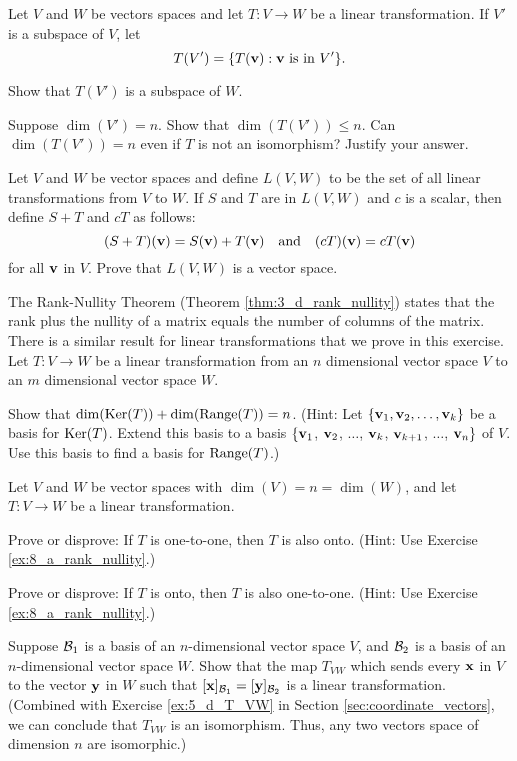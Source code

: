\item Let $V$ and $W$ be vectors spaces and let $T: V \to W$ be a linear transformation. If $V'$ is a subspace of $V$, let 
\[T(V') = \{T(\mathbf{v}) : \mathbf{v} \text{ is in } V'\}.\]
	\ba
	\item Show that $T(V')$ is a subspace of $W$. 
	\item Suppose $\dim(V') = n$. Show that $\dim(T(V')) \leq n$. Can  $\dim(T(V')) = n$ even if $T$ is not an isomorphism? Justify your answer. 
	\ea



\item \label{ex:8_a_transformation_space} Let $V$ and $W$ be vector spaces and define $L(V,W)$ to be the set of all linear transformations from $V$ to $W$. If $S$ and $T$ are in $L(V,W)$ and $c$ is a scalar,  then define $S+T$ and $cT$ as follows:
\[(S+T)(\vv) = S(\vv) + T(\vv) \ \ \text{ and } \ \ (cT)(\vv) = cT(\vv)\]
for all $\mathbf{v}$ in $V$. Prove that $L(V,W)$ is a vector space. 
 
\item \label{ex:8_a_rank_nullity} The Rank-Nullity Theorem (Theorem \ref{thm:3_d_rank_nullity}) states that the rank plus the nullity of a matrix equals the number of columns of the matrix. There is a similar result for linear transformations that we prove in this exercise. Let $T : V \to W$ be a linear transformation from an $n$ dimensional vector space $V$ to an $m$ dimensional vector space $W$. 

Show that $\dim(\text{Ker}(T)) + \dim(\text{Range}(T)) = n$. (Hint: Let $\{\mathbf{v}_1, \mathbf{v}_2, \ldots, \mathbf{v}_k\}$ be a basis for $\text{Ker}(T)$. Extend this basis to a basis $\{\mathbf{v}_1$, $\mathbf{v}_2$, $\ldots$, $\mathbf{v}_k$, $\mathbf{v}_{k+1}$, $\ldots$, $\mathbf{v}_n\}$ of $V$. Use this basis to find a basis for $\text{Range}(T)$.) 
	 
\item  Let $V$ and $W$ be vector spaces with $\dim(V) = n = \dim(W)$, and let $T: V \to W$ be a linear transformation.
	\ba
	\item Prove or disprove: If $T$ is one-to-one, then $T$ is also onto. (Hint: Use Exercise  \ref{ex:8_a_rank_nullity}.)
	
	\item Prove or disprove: If $T$ is onto, then $T$ is also one-to-one. (Hint: Use Exercise  \ref{ex:8_a_rank_nullity}.)
 
 	\ea

\item Suppose $\mathcal{B}_1$ is a basis of an $n$-dimensional  vector space $V$, and $\mathcal{B}_2$ is a basis of an $n$-dimensional vector space $W$. Show that the map $T_{VW}$ which sends every $\mathbf{x}$ in $V$ to the vector $\mathbf{y}$ in $W$ such that $[\mathbf{x}]_{\mathcal{B}_1} = [\mathbf{y}]_{\mathcal{B}_2}$ is a linear transformation. (Combined with Exercise \ref{ex:5_d_T_VW} in Section \ref{sec:coordinate_vectors}, we can conclude that $T_{VW}$ is an isomorphism. Thus, any two vectors space of dimension $n$ are isomorphic.)

